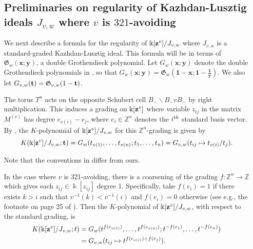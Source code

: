 \documentclass[12pt]{amsart}
\theoremstyle{definition}
\theoremstyle{remark}
\numberwithin{equation}{section}
\begin{document}
 


\subsection{Preliminaries on regularity of Kazhdan-Lusztig ideals $J_{v,w}$ where $v$ is $321$-avoiding}\label{sec:321RegPrelims}
We next describe a formula for the regularity of $\Bbbk[{\bf z}^v]/J_{v,w}$ where $J_{v,w}$ is a standard-graded Kazhdan-Lusztig ideal. This formula will be in terms of $\mathfrak G_w({\mathbf x};{\mathbf y})$, a double Grothendieck polynomial. 
Let $G_w(\mathbf{x};\mathbf{y})$ denote the double Grothendieck polynomials in \cite{KM}, so that  $G_w(\mathbf{x};\mathbf{y})=\mathfrak G_w({\mathbf 1-\mathbf x};{\mathbf 1-\frac{\mathbf 1}{\mathbf y}})$. We also let $G_{v,w}({\bf t}) = \mathfrak{G}_{v,w}(1-{\bf t})$.


The torus $T^n$ acts on the opposite Schubert cell $B_-\backslash B_- v B_-$ by right multiplication. This induces a grading on $\Bbbk[{\bf z}^v]$ where variable $z_{ij}$ in the matrix $M^{(v)}$ has degree $e_{v(i)}-e_j$, where $e_i\in \mathbb{Z}^n$ denotes the $i^{\rm th}$ standard basis vector. By \cite[Theorem~4.5]{WooYongGrobner}, the $K$-polynomial of $\Bbbk[{\bf z}^v]/J_{v,w}$ for this $\mathbb{Z}^n$-grading is given by
\begin{equation}\label{eq:kPolyKLzn}
    K(\Bbbk[{\bf z}^v]/J_{v,w};{\bf t}) = G_w(t_{v(1)},\dots,t_{v(n)};t_1,\dots, t_n) = G_{v,w}(t_{ij}\mapsto t_{v(i)}/t_j).
\end{equation}

Note that the conventions in \cite{WooYongGrobner} differ from ours.



In the case where $v$ is 321-avoiding, there is a coarsening of the grading $f:\mathbb{Z}^n\rightarrow \mathbb{Z}$ which gives each $z_{ij}\in \Bbbk[z_{ij}]$ degree 1. Specifically, take $f(e_i) = 1$ if there exists $k>i$ such that $v^{-1}(k)<v^{-1}(i)$ and $f(e_i) = 0$ otherwise (see e.g., the footnote on page 25 of \cite{Knutson-Frob}). Then the $K$-polynomial of $\Bbbk[{\bf z}^v]/J_{v,w}$, with respect to the standard grading, is
\begin{align}\label{eq:kPolyKLst}
\begin{split}
  K(\Bbbk[{\bf z}^v]/J_{v,w};{ t}) &= G_w(t^{f(e_{v(1)})},\dots,t^{f(e_{v(n)})};t^{-f(e_1)},\dots, t^{-f(e_n)}) \\
    &= G_{v,w}(t_{ij}\mapsto t^{f(e_{v(i)})+f(e_j)}).  
\end{split}
\end{align}
\end{document}
